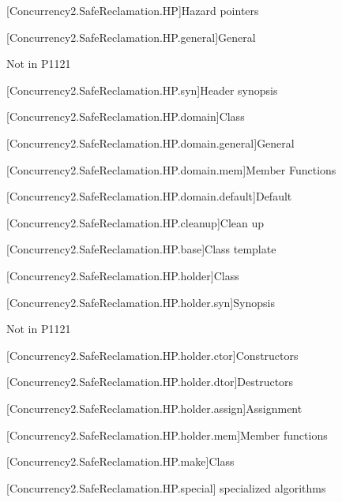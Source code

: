 
[Concurrency2.SafeReclamation.HP]{Hazard pointers}

[Concurrency2.SafeReclamation.HP.general]{General}

Not in P1121

[Concurrency2.SafeReclamation.HP.syn]{Header  synopsis}

[Concurrency2.SafeReclamation.HP.domain]{Class }

[Concurrency2.SafeReclamation.HP.domain.general]{General}

[Concurrency2.SafeReclamation.HP.domain.mem]{Member Functions}

[Concurrency2.SafeReclamation.HP.domain.default]{Default }

[Concurrency2.SafeReclamation.HP.cleanup]{Clean up}

[Concurrency2.SafeReclamation.HP.base]{Class template }

[Concurrency2.SafeReclamation.HP.holder]{Class }

[Concurrency2.SafeReclamation.HP.holder.syn]{Synopsis}

Not in P1121

[Concurrency2.SafeReclamation.HP.holder.ctor]{Constructors}

[Concurrency2.SafeReclamation.HP.holder.dtor]{Destructors}

[Concurrency2.SafeReclamation.HP.holder.assign]{Assignment}

[Concurrency2.SafeReclamation.HP.holder.mem]{Member functions}

[Concurrency2.SafeReclamation.HP.make]{Class }

[Concurrency2.SafeReclamation.HP.special]{ specialized algorithms}
